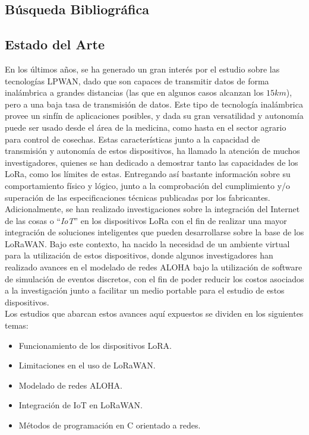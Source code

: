 \begin{justify}
\chapter[Búsqueda Bibliográfica]{Búsqueda Bibliográfica}
\label{ch:estadodelarte}

\section{Estado del Arte}
En los últimos años, se ha generado un gran interés por el estudio sobre las tecnologías LPWAN, dado que son capaces de transmitir datos de forma inalámbrica a grandes distancias (las que en algunos casos alcanzan los $15km$), pero a una baja tasa de transmisión de datos. Este tipo de tecnología inalámbrica provee un sinfín de aplicaciones posibles, y dada su gran versatilidad y autonomía puede ser usado desde el área de la medicina, como hasta en el sector agrario para control de cosechas. Estas características junto a la capacidad de transmisión y autonomía de estos dispositivos, ha llamado la atención de muchos investigadores, quienes se han dedicado a demostrar tanto las capacidades de los LoRa, como los límites de estas. Entregando así bastante información sobre su comportamiento físico y lógico, junto a la comprobación del cumplimiento y/o superación de las especificaciones técnicas publicadas por los fabricantes. Adicionalmente, se han realizado investigaciones sobre la integración del Internet de las cosas o ``\textit{IoT}'' en los dispositivos LoRa con el fin de realizar una mayor integración de soluciones inteligentes que pueden desarrollarse sobre la base de los LoRaWAN. Bajo este contexto, ha nacido la necesidad de un ambiente virtual para la utilización de estos dispositivos, donde algunos investigadores han realizado avances en el modelado de redes ALOHA bajo la utilización de software de simulación de eventos discretos, con el fin de poder reducir los costos asociados a la investigación junto a facilitar un medio portable  para el estudio de estos dispositivos.\\
Los estudios que abarcan estos avances aquí expuestos se dividen en los siguientes temas:
\begin{itemize}
\item Funcionamiento de los dispositivos LoRA.\\
\item Limitaciones en el uso de LoRaWAN.\\
\item Modelado de redes ALOHA.\\
\item Integración de IoT en LoRaWAN.\\
\item Métodos de programación en C orientado a redes.\\
\end{itemize} 


\end{justify}
